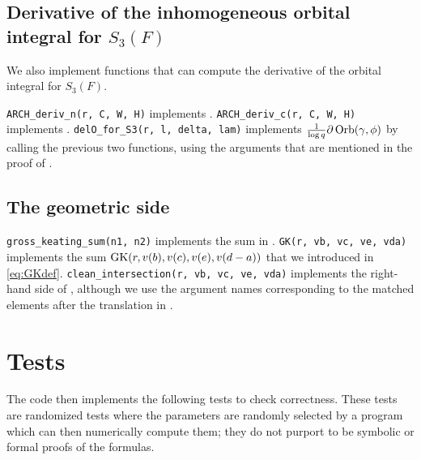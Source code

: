 \subsection{Derivative of the inhomogeneous orbital integral for $S_3(F)$}
We also implement functions that can compute the
derivative of the orbital integral for $S_3(F)$.

\begin{itemize}
  \ii \texttt{ARCH\_deriv\_n(r, C, W, H)} implements .
  \ii \texttt{ARCH\_deriv\_c(r, C, W, H)} implements .
  \ii \texttt{delO\_for\_S3(r, l, delta, lam)} implements
  $\frac{1}{\log q}\partial\operatorname{Orb}(\gamma, \phi)$
  by calling the previous two functions,
  using the arguments that are mentioned in the proof of .
\end{itemize}

\subsection{The geometric side}
\begin{itemize}
  \ii \texttt{gross\_keating\_sum(n1, n2)} implements the sum in .
  \ii \texttt{GK(r, vb, vc, ve, vda)} implements the sum $\operatorname{GK}(r, v(b), v(c), v(e), v(d-a))$
  that we introduced in \eqref{eq:GKdef}.
  \ii \texttt{clean\_intersection(r, vb, vc, ve, vda)} implements the
  right-hand side of ,
  although we use the argument names corresponding to the matched elements
  after the translation in .
\end{itemize}

\section{Tests}
The code then implements the following tests to check correctness.
These tests are randomized tests where the parameters are randomly selected by a program
which can then numerically compute them;
they do not purport to be symbolic or formal proofs of the formulas.

